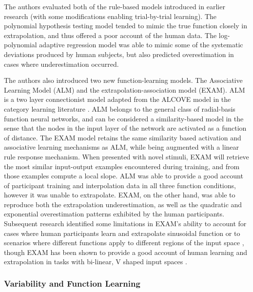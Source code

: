 \documentclass[
  12pt,
  letterpaper,
]{article}
\begin{document}
The authors evaluated both of the rule-based models introduced in
earlier research (with some modifications enabling trial-by-trial
learning). The polynomial hypothesis testing model
\autocite{carrollFunctionalLearningLearning1963,brehmerHypothesesRelationsScaled1974}
tended to mimic the true function closely in extrapolation, and thus
offered a poor account of the human data. The log-polynomial adaptive
regression model \autocite{kohFunctionLearningInduction1991} was able to
mimic some of the systematic deviations produced by human subjects, but
also predicted overestimation in cases where underestimation occurred.

The authors also introduced two new function-learning models. The
Associative Learning Model (ALM) and the extrapolation-association model
(EXAM). ALM is a two layer connectionist model adapted from the ALCOVE
model in the category learning literature
\autocite{kruschkeALCOVEExemplarbasedConnectionist1992}. ALM belongs to
the general class of radial-basis function neural networks, and can be
considered a similarity-based model in the sense that the nodes in the
input layer of the network are activated as a function of distance. The
EXAM model retains the same similarity based activation and associative
learning mechanisms as ALM, while being augmented with a linear rule
response mechanism. When presented with novel stimuli, EXAM will
retrieve the most similar input-output examples encountered during
training, and from those examples compute a local slope. ALM was able to
provide a good account of participant training and interpolation data in
all three function conditions, however it was unable to extrapolate.
EXAM, on the other hand, was able to reproduce both the extrapolation
underestimation, as well as the quadratic and exponential overestimation
patterns exhibited by the human participants. Subsequent research
identified some limitations in EXAM's ability to account for cases where
human participants learn and extrapolate sinusoidal function
\textcite{bottNonmonotonicExtrapolationFunction2004} or to scenarios
where different functions apply to different regions of the input space
\textcite{kalishPopulationLinearExperts2004}, though EXAM has been shown
to provide a good account of human learning and extrapolation in tasks
with bi-linear, V shaped input spaces
\textcite{mcdanielPredictingTransferPerformance2009}.

\subsubsection{Variability and Function
Learning}\label{variability-and-function-learning}
\end{document}
